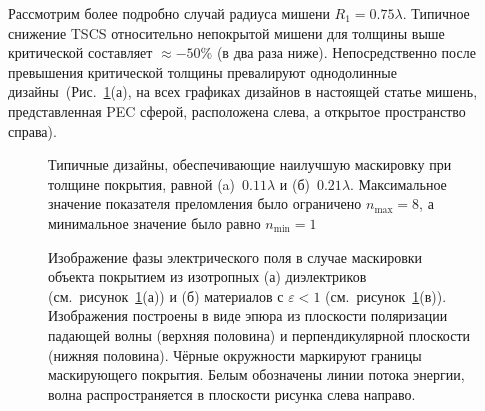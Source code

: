 Рассмотрим более подробно случай радиуса мишени ${R_1 =
  0.75\lambda}$. Типичное снижение TSCS относительно непокрытой мишени
для толщины выше критической составляет ${\approx -50\%}$ (в два раза
ниже). Непосредственно после превышения критической толщины
превалируют однодолинные
дизайны~(Рис.~\ref{img:designs}(а), на всех графиках
дизайнов в настоящей статье мишень, представленная PEC сферой,
расположена слева, а открытое пространство справа).
\begin{figure}[p]
  \hfill
  \begin{minipage}[ht]{0.44\linewidth}
  \end{minipage}
  \hfill
  \begin{minipage}[ht]{0.44\linewidth}
  \end{minipage}
  \caption{Типичные дизайны, обеспечивающие наилучшую маскировку при
    толщине покрытия, равной (a)~$0.11\lambda$ и
    (б)~$0.21\lambda$. Максимальное значение показателя преломления
    было ограничено $n_{\mathrm{max}}=8$, а минимальное значение было
    равно $n_{\mathrm{min}}=1$ }
  \label{img:designs}  
\end{figure}
\begin{figure}[p]
  \begin{minipage}[ht]{0.495\linewidth}
  \end{minipage}
  \hfill
  \begin{minipage}[ht]{0.495\linewidth}
  \end{minipage}
  \caption{Изображение фазы электрического поля в случае маскировки
    объекта покрытием из изотропных (а) диэлектриков
    (см.~рисунок~\ref{img:designs}(а)) и (б) материалов с
    ${\varepsilon <1}$ (см.~рисунок~\ref{img:designs}(в)). Изображения
    построены в виде эпюра из плоскости поляризации падающей волны
    (верхняя половина) и перпендикулярной плоскости (нижняя
    половина). Чёрные окружности маркируют границы маскирующего
    покрытия. Белым обозначены линии потока энергии, волна
    распространяется в плоскости рисунка слева направо.}
  \label{img:field-phase}  
\end{figure}
